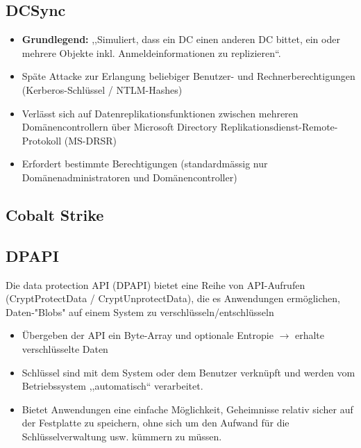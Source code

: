\subsection{DCSync}
\begin{itemize}
    \item \textbf{Grundlegend:} ,,Simuliert, dass ein DC einen anderen DC bittet, ein oder mehrere Objekte inkl. Anmeldeinformationen zu replizieren``.
    \item Späte Attacke zur Erlangung beliebiger Benutzer- und Rechnerberechtigungen (Kerberos-Schlüssel / NTLM-Hashes)
    \item Verlässt sich auf Datenreplikationsfunktionen zwischen mehreren Domänencontrollern über Microsoft Directory Replikationsdienst-Remote-Protokoll (MS-DRSR)
    \item Erfordert bestimmte Berechtigungen (standardmässig nur Domänenadministratoren und Domänencontroller)
\end{itemize}

\subsection{Cobalt Strike}

\subsection{DPAPI}
Die data protection API (DPAPI) bietet eine Reihe von API-Aufrufen (CryptProtectData / CryptUnprotectData), die es Anwendungen ermöglichen, Daten-"Blobs" auf einem System zu verschlüsseln/entschlüsseln
\begin{itemize}
    \item Übergeben der API ein Byte-Array und optionale Entropie $\rightarrow$  erhalte verschlüsselte Daten
    \item Schlüssel sind mit dem System oder dem Benutzer verknüpft und werden vom Betriebssystem ,,automatisch`` verarbeitet.
    \item Bietet Anwendungen eine einfache Möglichkeit, Geheimnisse relativ sicher auf der Festplatte zu speichern, ohne sich um den Aufwand für die Schlüsselverwaltung usw. kümmern zu müssen.
\end{itemize}

